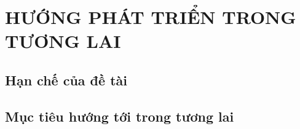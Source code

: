 
\newpage
\chapter{HƯỚNG PHÁT TRIỂN TRONG TƯƠNG LAI}

\section{Hạn chế của đề tài}

\section{Mục tiêu hướng tới trong tương lai}

